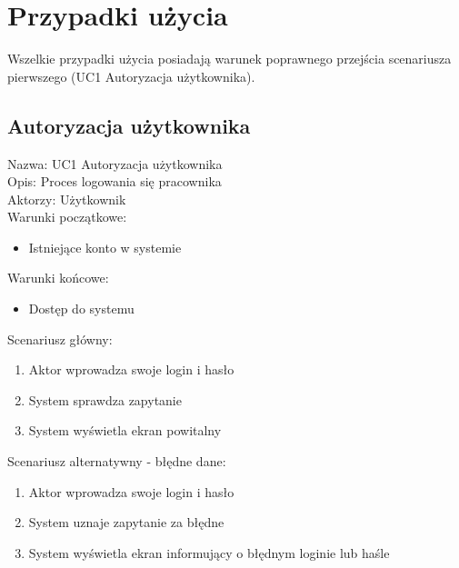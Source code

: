 \section{Przypadki użycia}
Wszelkie przypadki użycia posiadają warunek poprawnego przejścia scenariusza pierwszego (UC1 Autoryzacja użytkownika).

\subsection{Autoryzacja użytkownika} 
Nazwa: UC1 Autoryzacja użytkownika \\
Opis: Proces logowania się pracownika \\
Aktorzy: Użytkownik \\
Warunki początkowe: 
\begin{itemize}
\item Istniejące konto w systemie 
\end{itemize}
Warunki końcowe: 
\begin{itemize}
\item Dostęp do systemu 
\end{itemize}
Scenariusz główny:
\begin{enumerate}
\item Aktor wprowadza swoje login i hasło
\item System sprawdza zapytanie
\item System wyświetla ekran powitalny
\end{enumerate}
Scenariusz alternatywny - błędne dane: 
\begin{enumerate}
\item Aktor wprowadza swoje login i hasło
\item System uznaje zapytanie za błędne
\item System wyświetla ekran informujący o błędnym loginie lub haśle 
\end{enumerate}

